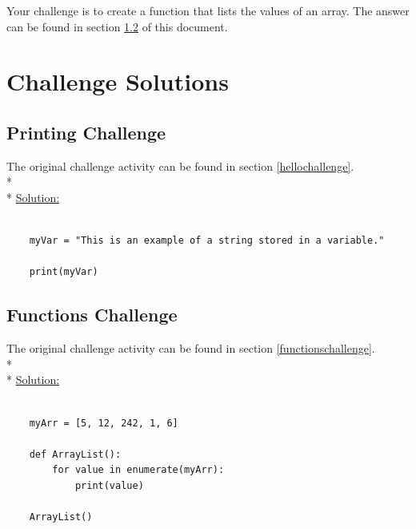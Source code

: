\documentclass[12pt, letterpaper]{article}
\begin{document}
    Your challenge is to create a function that lists the values of an array. The answer can be found in section \ref{functionsol} of this document.

    
    \section{Challenge Solutions} \label{solutions}

    \subsection{Printing Challenge} \label{hellosol}
    The original challenge activity can be found in section \ref{hellochallenge}. \\*\\*
    \underline{Solution:}

    \begin{verbatim}
    
    myVar = "This is an example of a string stored in a variable."

    print(myVar)

    \end{verbatim}

    \subsection{Functions Challenge} \label{functionsol}

    The original challenge activity can be found in section \ref{functionschallenge}. \\* \\*
    \underline{Solution:}

    \begin{verbatim}

    myArr = [5, 12, 242, 1, 6]

    def ArrayList():
        for value in enumerate(myArr):
            print(value)
    
    ArrayList()
    
    \end{verbatim}
\end{document}
